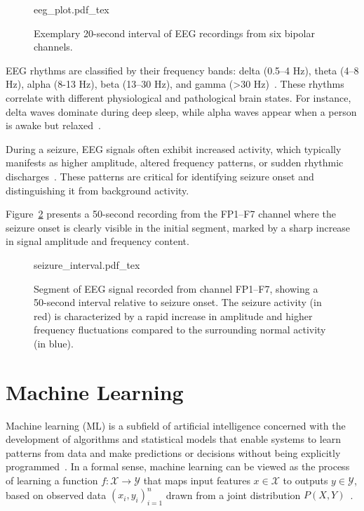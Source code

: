 \begin{figure}[h!]
	\centering
    \def\svgwidth{420pt}
 	{eeg_plot.pdf_tex} 	 	
	\caption[Exemplary 20 seconds of six different EEG channels]{Exemplary 20-second interval of EEG recordings from six bipolar channels.}
	\label{fig:multi_channel}
\end{figure}

EEG rhythms are classified by their frequency bands: delta (0.5–4 Hz), theta (4–8 Hz), alpha (8-13 Hz), beta (13–30 Hz), and gamma (>30 Hz)~\cite{niedermeyer2005}. These rhythms correlate with different physiological and pathological brain states. For instance, delta waves dominate during deep sleep, while alpha waves appear when a person is awake but relaxed~\cite{niedermeyer2005}.

During a seizure, EEG signals often exhibit increased activity, which typically manifests as higher amplitude, altered frequency patterns, or sudden rhythmic discharges~\cite{seizuresurvey}. These patterns are critical for identifying seizure onset and distinguishing it from background activity.

Figure~\ref{fig:seizure_interval} presents a 50-second recording from the FP1–F7 channel where the seizure onset is clearly visible in the initial segment, marked by a sharp increase in signal amplitude and frequency content.

\begin{figure}[h!]
	\centering
    \def\svgwidth{400pt}
 	{seizure_interval.pdf_tex} 	 	
	\caption[EEG channel FP1–F7 around seizure onset]{Segment of EEG signal recorded from channel FP1–F7, showing a 50-second interval relative to seizure onset. The seizure activity (in red) is characterized by a rapid increase in amplitude and higher frequency fluctuations compared to the surrounding normal activity (in blue).}
	\label{fig:seizure_interval}
\end{figure}

\section{Machine Learning}
Machine learning (ML) is a subfield of artificial intelligence concerned with the development of algorithms and statistical models that enable systems to learn patterns from data and make predictions or decisions without being explicitly programmed~\cite{mitchell1997machine}. In a formal sense, machine learning can be viewed as the process of learning a function $f: \mathcal{X} \rightarrow \mathcal{Y}$ that maps input features $x \in \mathcal{X}$ to outputs $y \in \mathcal{Y}$, based on observed data $(x_i, y_i)_{i=1}^n$ drawn from a joint distribution $P(X, Y)$~\cite{bishop2006pattern}.


